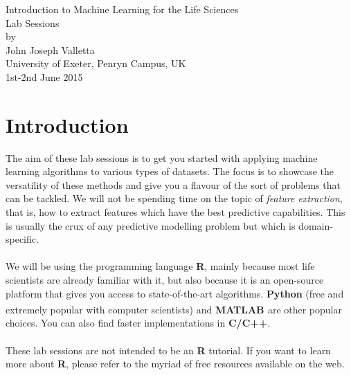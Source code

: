 \documentclass[a4paper,11pt]{article}
\begin{document}
\begin{center}
{\huge Introduction to Machine Learning for the Life Sciences\\[0.5cm]
Lab Sessions}\\[0.5cm]
by\\[0.5cm]
John Joseph Valletta\\
University of Exeter, Penryn Campus, UK\\[0.5cm]
{\large 1st-2nd June 2015}\\[4cm]
\end{center}

\section*{Introduction}
The aim of these lab sessions is to get you started with applying machine learning
algorithms to various types of datasets. The focus is to showcase the versatility of
these methods and give you a flavour of the sort of problems that can be tackled.
We will not be spending time on the topic of \textit{feature extraction}, 
that is, how to extract features which have the best predictive capabilities. This is
usually the crux of any predictive modelling problem but which is domain-specific.
\\\\
We will be using the programming language \textbf{R}, mainly because most life scientists
are already familiar with it, but also because it is an open-source platform that gives you
access to state-of-the-art algorithms. \textbf{Python} (free and extremely 
popular with computer scientists) and \textbf{MATLAB \textsuperscript{\textregistered}} are other
popular choices. You can also find faster implementations in \textbf{C/C++}.
\\\\
These lab sessions are not intended to be an \textbf{R} tutorial. If you want to learn more
about \textbf{R}, please refer to the myriad of free resources available on the web.
\end{document}
